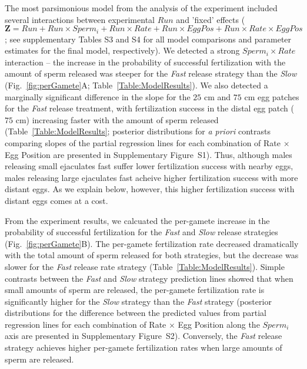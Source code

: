 \documentclass{article}
\begin{document}
	The most parsimonious model from the analysis of the  experiment included several interactions between experimental $Run$ and 'fixed' effects ($\mathbf{Z} = Run + Run \times Sperm_i + Run \times Rate + Run \times EggPos + Run \times Rate \times EggPos$; see supplementary Tables S3 and S4 for all model comparisons and parameter estimates for the final model, respectively). We detected a strong $Sperm_i \times Rate$ interaction -- the increase in the probability of successful fertilization with the amount of sperm released was steeper for the \textit{Fast} release strategy than the \textit{Slow} (Fig.~\ref{fig:perGamete}A; Table~\ref{Table:ModelResults}). We also detected a marginally significant difference in the slope for the $25$ cm and $75$ cm egg patches for the \textit{Fast} release treatment, with fertilization success in the distal egg patch ($75$ cm) increasing faster with the amount of sperm released (Table~\ref{Table:ModelResults}; posterior distributions for \textit{a priori} contrasts comparing slopes of the partial regression lines for each combination of Rate $\times$ Egg Position are presented in Supplementary Figure~S1). Thus, although males releasing small ejaculates fast suffer lower fertilization success with nearby eggs, males releasing large ejaculates fast acheive higher fertilization success with more distant eggs. As we explain below, however, this higher fertilization success with distant eggs comes at a cost.

	From the  experiment results, we calcuated the per-gamete increase in the probability of successful fertilization for the \textit{Fast} and \textit{Slow} release strategies (Fig.~\ref{fig:perGamete}B). The per-gamete fertilization rate decreased dramatically with the total amount of sperm released for both strategies, but the decrease was slower for the \textit{Fast} release rate strategy (Table~\ref{Table:ModelResults}). Simple contrasts between the \textit{Fast} and \textit{Slow} strategy prediction lines showed that when small amounts of sperm are released, the per-gamete fertilization rate is significantly higher for the \textit{Slow} strategy than the \textit{Fast} strategy (posterior distributions for the difference between the predicted values from partial regression lines for each combination of Rate $\times$ Egg Position along the $Sperm_i$ axis are presented in Supplementary Figure~S2). Conversely, the \textit{Fast} release strategy achieves higher per-gamete fertilization rates when large amounts of sperm are released.
\end{document}
